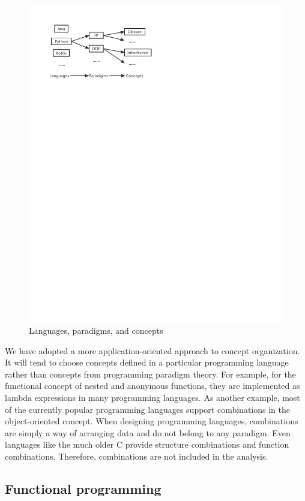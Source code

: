 \begin{figure}[htbp]
    \centerline{\includegraphics[scale=0.8]{figures/concept}}
    \caption{Languages, paradigms, and concepts}
    \label{fig:concept}
\end{figure}


We have adopted a more application-oriented approach to concept organization.
It will tend to choose concepts defined in a particular programming
language rather than concepts from programming paradigm theory.
For example, for the functional concept of nested and anonymous functions,
they are implemented as lambda expressions in many programming languages.
As another example, most of the currently popular programming languages
support combinations in the object-oriented concept.
When designing programming languages, combinations are simply a way of
arranging data and do not belong to any paradigm.
Even languages like the much older C provide structure combinations and
function combinations.
Therefore, combinations are not included in the analysis.

\subsection{Functional programming}

